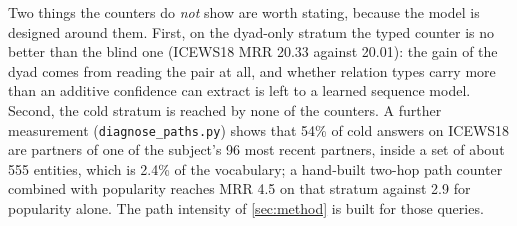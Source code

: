 Two things the counters do \emph{not} show are worth stating, because the model is designed around them. First, on the dyad-only stratum the typed counter is no better than the blind one (ICEWS18 MRR 20.33 against 20.01): the gain of the dyad comes from reading the pair at all, and whether relation types carry more than an additive confidence can extract is left to a learned sequence model. Second, the cold stratum is reached by none of the counters. A further measurement (\texttt{diagnose\_paths.py}) shows that 54\% of cold answers on ICEWS18 are partners of one of the subject's 96 most recent partners, inside a set of about 555 entities, which is 2.4\% of the vocabulary; a hand-built two-hop path counter combined with popularity reaches MRR 4.5 on that stratum against 2.9 for popularity alone. The path intensity of \cref{sec:method} is built for those queries.
